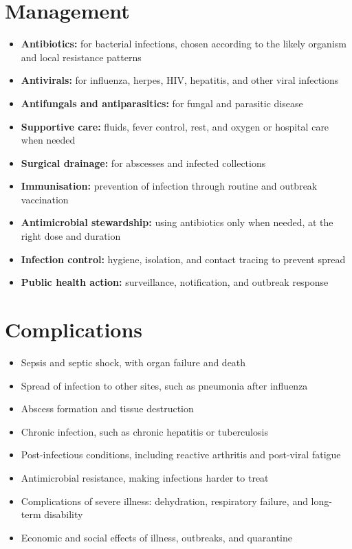 \section*{Management}
\begin{itemize}
    \item \textbf{Antibiotics:} for bacterial infections, chosen according to the likely organism and local resistance patterns
    \item \textbf{Antivirals:} for influenza, herpes, HIV, hepatitis, and other viral infections
    \item \textbf{Antifungals and antiparasitics:} for fungal and parasitic disease
    \item \textbf{Supportive care:} fluids, fever control, rest, and oxygen or hospital care when needed
    \item \textbf{Surgical drainage:} for abscesses and infected collections
    \item \textbf{Immunisation:} prevention of infection through routine and outbreak vaccination
    \item \textbf{Antimicrobial stewardship:} using antibiotics only when needed, at the right dose and duration
    \item \textbf{Infection control:} hygiene, isolation, and contact tracing to prevent spread
    \item \textbf{Public health action:} surveillance, notification, and outbreak response
\end{itemize}

\section*{Complications}
\begin{itemize}
    \item Sepsis and septic shock, with organ failure and death
    \item Spread of infection to other sites, such as pneumonia after influenza
    \item Abscess formation and tissue destruction
    \item Chronic infection, such as chronic hepatitis or tuberculosis
    \item Post-infectious conditions, including reactive arthritis and post-viral fatigue
    \item Antimicrobial resistance, making infections harder to treat
    \item Complications of severe illness: dehydration, respiratory failure, and long-term disability
    \item Economic and social effects of illness, outbreaks, and quarantine
\end{itemize}

